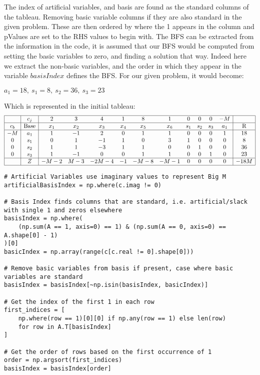 \documentclass[letterpaper, a4paper]{article}
\begin{document}
The index of artificial variables, and basis are found as the standard columns of the tableau. Removing basic variable columns if they are also standard in the given problem. These are then ordered by where the 1 appears in the column and pValues are set to the RHS values to begin with. The BFS can be extracted from the information in the code, it is assumed that our BFS would be computed from setting the basic variables to zero, and finding a solution that way. Indeed here we extract the non-basic variables, and the order in which they appear in the variable $basisIndex$ defines the BFS. For our given problem, it would become:

\begin{center}
$a_1 = 18,\ s_1 = 8,\ s_2 = 36,\ s_3 = 23$
\end{center}
Which is represented in the initial tableau:
\[
\begin{array}{|c|c|cccccccccc|c|}
\hline
& c_j & 2 & 3 & 4 & 1 & 8 & 1 & 0 & 0 & 0 & -M & \\
\hline
c_b & \text{Base} & x_1 & x_2 & x_3 & x_4 & x_5 & x_6 & s_1 & s_2 & s_3 & a_1 & \text{R} \\
\hline
-M & a_1 & 1 & -1 & 2 & 0 & 1 & 1 & 0 & 0 & 0 & 1 & 18 \\
0 &  s_1 & 0 & 1 & -1 & 1 & 0 & 3 & 1 & 0 & 0 & 0 & 8 \\
0 &  s_2 & 1 & 1 & -3 & 1 & 1 & 0 & 0 & 1 & 0 & 0 & 36 \\
0 &  s_3 & 1 & -1 & 0 & 0 & 1 & 1 & 0 & 0 & 1 & 0 & 23 \\
\hline
& Z & -M-2 & M-3 & -2M-4 & -1 & -M-8 & -M-1 & 0 & 0 & 0 & 0 & -18M \\
\hline
\end{array}
\]

\begingroup
\fontsize{8}{10}\selectfont
\begin{verbatim}
# Artificial Variables use imaginary values to represent Big M
artificialBasisIndex = np.where(c.imag != 0)

# Basis Index finds columns that are standard, i.e. artificial/slack with single 1 and zeros elsewhere
basisIndex = np.where(
    (np.sum(A == 1, axis=0) == 1) & (np.sum(A == 0, axis=0) == A.shape[0] - 1)
)[0]
basicIndex = np.array(range(c[c.real != 0].shape[0]))

# Remove basic variables from basis if present, case where basic variables are standard
basisIndex = basisIndex[~np.isin(basisIndex, basicIndex)]

# Get the index of the first 1 in each row
first_indices = [
    np.where(row == 1)[0][0] if np.any(row == 1) else len(row)
    for row in A.T[basisIndex]
]

# Get the order of rows based on the first occurrence of 1
order = np.argsort(first_indices)
basisIndex = basisIndex[order]
\end{verbatim}
\endgroup
\end{document}
